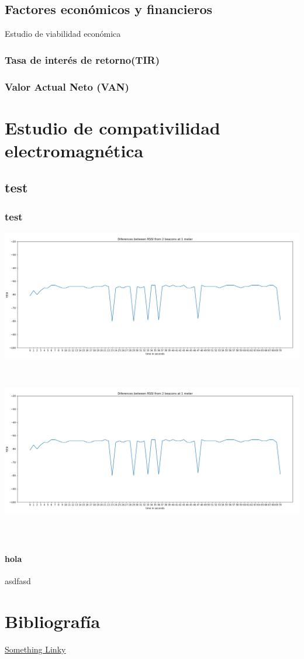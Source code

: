 \documentclass[a4paper ,12pt, onecolumn]{article}
\begin{document}
    \subsection{Factores económicos y financieros}
    Estudio de viabilidad económica
        \subsubsection{Tasa de interés de retorno(TIR)}
        \subsubsection{Valor Actual Neto (VAN)}

\section{Estudio de compativilidad electromagnética}
\subsection{test}
\subsubsection{test}

\includegraphics[scale=0.3]{5min_beacon_rssi}
\includegraphics[width=15cm, height=8cm]{5min_beacon_rssi}
\paragraph{hola}
asdfasd



\section{Bibliografía}
\href{https://campus.masterd.es/campusvirtual/index.htm}{Something Linky} 
\end{document}
